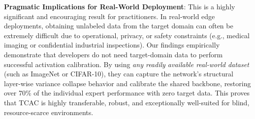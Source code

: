 \documentclass{article}
\theoremstyle{plain}
\theoremstyle{definition}
\theoremstyle{remark}
\begin{document}
\textbf{Pragmatic Implications for Real-World Deployment}:
This is a highly significant and encouraging result for practitioners. In real-world edge deployments, obtaining unlabeled data from the target domain can often be extremely difficult due to operational, privacy, or safety constraints (e.g., medical imaging or confidential industrial inspections). Our findings empirically demonstrate that developers do not need target-domain data to perform successful activation calibration. By using \textit{any readily available real-world dataset} (such as ImageNet or CIFAR-10), they can capture the network's structural layer-wise variance collapse behavior and calibrate the shared backbone, restoring over 70\% of the individual expert performance with zero target data. This proves that TCAC is highly transferable, robust, and exceptionally well-suited for blind, resource-scarce environments.
\end{document}
